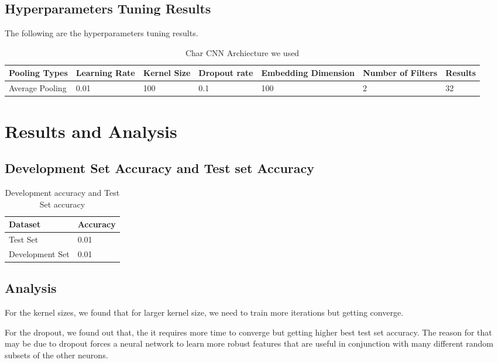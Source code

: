 \documentclass{article}
\begin{document}
\subsection{Hyperparameters Tuning Results}
The following are the hyperparameters tuning results.

\begin{table}[htb]
	\caption{Char CNN Archiecture we used}
	\label{sample-table}
	\centering
	\begin{tabular}{lllllll}
		\toprule
		\cmidrule{1-7}
		Pooling Types & Learning Rate & Kernel Size & Dropout rate & Embedding Dimension 	& Number of Filters & Results\\
		\midrule
		Average Pooling & 0.01  & 100 & 0.1 & 100 & 2 & 32 \\
		\bottomrule
	\end{tabular}
\end{table}

\pagebreak

\section{Results and Analysis}

\subsection{Development Set Accuracy and Test set Accuracy}

\begin{table}[htb]
	\caption{Development accuracy and Test Set accuracy}
	\label{sample-table}
	\centering
	\begin{tabular}{ll}
		\toprule
		\cmidrule{1-2}
		Dataset &Accuracy\\
		\midrule
		Test Set & 0.01   \\
		Development Set & 0.01  \\
		\bottomrule
	\end{tabular}
\end{table}

\subsection{Analysis}
For the kernel sizes, we found that for larger kernel size, we need to train more iterations but getting converge.

For the dropout, we found out that, the it requires more time to converge but getting higher best test set accuracy. The reason for that may be due to dropout forces a neural network to learn more robust features that are useful in conjunction with many different random subsets of the other neurons.
\end{document}
